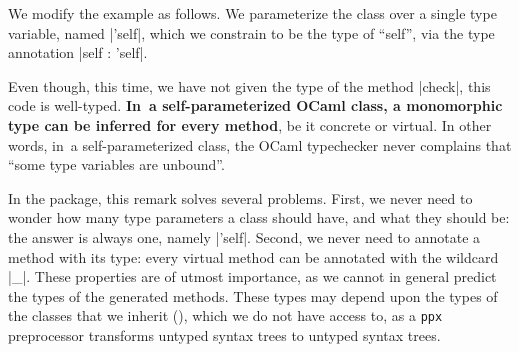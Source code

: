 \documentclass[11pt,a4paper,twoside]{article}
\renewcommand{\emph}[1]{\textbf{#1}}
\begin{document}
%
%

We modify the example as follows. We parameterize the class over a single type
variable, named \oc|'self|, which we constrain to be the type of ``self'', via
the type annotation \oc|self : 'self|.
%

Even though, this time, we have not given the type of the method \oc|check|,
this code is well-typed. \emph{In~a self-parameterized OCaml class, a
  monomorphic type can be inferred for every method}, be it concrete or
virtual. In other words, in~a self-parameterized class, the OCaml typechecker
never complains that ``some type variables are unbound''.

\begin{comment}
The inferred type of the above code is as follows:
\begin{mdframed}[backgroundcolor=green!10]
\begin{lstlisting}[keywords={}]
class virtual ['a] cell :
  'b ->
  object ('a)
    constraint 'a = < check : 'c -> 'b;
                      get : 'b;
                      set : 'c -> unit;
                      .. >
    val mutable x : 'b
    method virtual check : 'c -> 'b
    method get : 'b
    method set : 'c -> unit
  end
\end{lstlisting}
\end{mdframed}
\end{comment}

In the \visitors package, this remark solves several problems. First, we never
need to wonder how many type parameters a class should have, and what they
should be: the answer is always one, namely \oc|'self|. Second, we never need
to annotate a method with its type: every virtual method can be annotated with
the wildcard \oc|_|. These properties are of utmost importance, as we cannot
in general predict the types of the generated methods. These types may depend
upon the types of the classes that we inherit (), which we
do not have access to, as a \texttt{ppx} preprocessor transforms untyped
syntax trees to untyped syntax trees.
\end{document}
